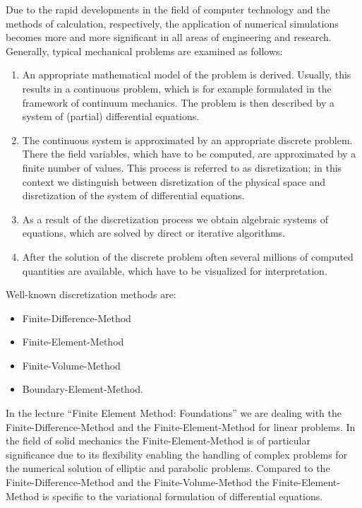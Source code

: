 \label{Section1}
Due to the rapid developments in the field of computer technology
and the methods of calculation, respectively, the application
of numerical simulations becomes more and more significant
in all areas of engineering and research.
Generally, typical mechanical problems are examined as follows:

\begin{enumerate}
\item An appropriate mathematical model of the problem 
is derived. 
Usually, this results in a continuous problem, 
which is for example formulated in the framework of 
continuum mechanics. 
The problem is then described by a system of (partial) 
differential equations. 

\item The continuous system is approximated 
by an appropriate discrete problem. 
There the field variables, which have to be computed, 
are approximated by a finite number of values. 
This process is referred to as disretization; 
in this context we distinguish between disretization 
of the physical space and disretization of the system of 
differential equations. 

\item As a result of the discretization process we obtain 
algebraic systems of equations, which are solved by 
direct or iterative algorithms. 

\item After the solution of the discrete problem often 
several millions of computed quantities are available, 
which have to be visualized for interpretation. 

\end{enumerate}

Well-known discretization methods are: 
\begin{itemize}
\item Finite-Difference-Method
\item Finite-Element-Method
\item Finite-Volume-Method
\item Boundary-Element-Method. 
\end{itemize}

In the lecture ``Finite Element Method: Foundations'' we 
are dealing with the Finite-Difference-Method and the 
Finite-Element-Method for linear problems. 
In the field of solid mechanics the Finite-Element-Method 
is of particular significance due to its flexibility 
enabling the handling of complex problems for the 
numerical solution of elliptic and parabolic problems. 
Compared to the Finite-Difference-Method and the 
Finite-Volume-Method the Finite-Element-Method is 
specific to the variational formulation of differential 
equations. 

